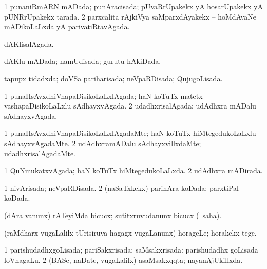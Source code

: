 {{\bentry
{} 
\gl{\gu}
\expl{}
\bmng
\bnum
\num{1} punaniRmARN mADada; punAracisada; pUvaRrUpakekx yA hosarUpakekx yA pUNRrUpakekx tarada. 
\num{2} parxcalita rAjkiVya saMparxdAyakekx -- hoMdAvaNe mADikoLaLxda yA parivatiRtavAgada. 
\enum
\emng
\eentry

\bentry
{} 
\gl{\gu}
\expl{}
\bmng
dAKlisalAgada. 
\emng
\eentry

\bentry
{} 
\gl{\gu}
\expl{}
\bmng
dAKlu mADada; namUdisada; gurutu hAkiDada. 
\emng
\eentry

\bentry
{} 
\gl{\gu}
\expl{}
\bmng
tapupx tidadxda; doVSa pariharisada; neVpaRDisada; QujugoLisada. 
\emng
\eentry

\bentry
{} 
\gl{\gu}
\expl{}
\bmng
\bnum
\num{1} punaHsAvxdhiVnapaDisikoLaLxlAgada; haN koTuTx matetx vashapaDisikoLaLxlu sAdhayxvAgada. 
\num{2} udadhxrisalAgada; udAdhxra mADalu sAdhayxvAgada. 
\enum
\emng
\eentry

\bentry
{} 
\gl{\kirxvi}
\expl{}
\bmng
\bnum
\num{1} punaHsAvxdhiVnapaDisikoLaLxlAgadaMte; haN koTuTx hiMtegedukoLaLxlu sAdhayxvAgadaMte. 
\num{2} udAdhxramADalu sAdhayxvillxdaMte; udadhxrisalAgadaMte. 
\enum
\emng
\eentry

\bentry
{} 
\gl{\gu}
\expl{}
\bmng
\bnum
\num{1} QuNmukatxvAgada; haN koTuTx hiMtegedukoLaLxda. 
\num{2} udAdhxra mADirada. 
\enum
\emng
\eentry

\bentry
{} 
\gl{\gu}
\expl{}
\bmng
\bnum
\num{1} nivArisada; neVpaRDisada. 
\num{2} (naSaTxkekx) parihAra koDada; parxtiPal koDada. 
\enum
\emng
\eentry

\bentry
{} 
\gl{\sakirx}
\expl{}
\bmng
(dAra \mo vanunx) rATeyiMda bicucx; sutitxruvudanunx bicucx (\akirx\ saha). 
\emng
\eentry

\bentry
{} 
\gl{\sakirx}
\bmng
(raMdharx \mo vugaLalilx tUrisiruva hagagx \mo vugaLanunx) horageLe; horakekx tege. 
\emng
\eentry

\bentry
{} 
\gl{\gu}
\expl{}
\bmng
\bnum
\num{1} parishudadhxgoLisada; pariSakxrisada; saMsakxrisada:  parishudadhx goLisada loVhagaLu. 
\num{2} (BASe, naDate, \mo vugaLalilx) asaMsakxqqta; nayanAjUkillxda. 
\enum
\emng
\eentry

}}
